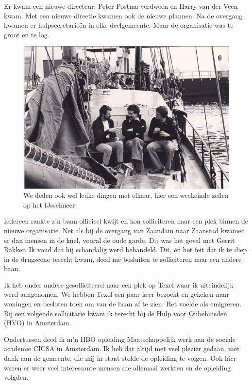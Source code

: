 \documentclass[10pt,twoside, openright]{memoir}
\begin{document}
Er kwam een nieuwe directeur. Peter Postma verdween en Harry van der Veen kwam. Met een nieuwe directie kwamen ook de nieuwe plannen. Na de overgang kwamen er hulpsecretarieën in elke deelgemeente. Maar de organisatie was te groot en te log. 

\begin{figure}
\includegraphics[width=\textwidth]{img/ch42/desoos_0004}
\caption*{\footnotesize We deden ook wel leuke dingen met elkaar, hier een weekeinde zeilen op het IJsselmeer.}
\end{figure}

Iedereen raakte z’n baan officieel kwijt en kon solliciteren naar een plek binnen de nieuwe organisatie. Net als bij de overgang van Zaandam naar Zaanstad kwamen er dan mensen in de knel, vooral de oude garde. Dit was het geval met Gerrit Bakker. Ik vond dat hij schandalig werd behandeld. Dit, én het feit dat ik te diep in de drugscene terecht kwam, deed me besluiten te solliciteren naar een andere baan. 

Ik heb onder andere gesolliciteerd naar een plek op Texel waar ik uiteindelijk werd aangenomen. We hebben Texel een paar keer bezocht en gekeken naar woningen en besloten toen om van de baan af te zien. Het voelde als emigreren. Bij een volgende sollicitatie kwam ik terecht bij de Hulp voor Onbehuisden (HVO) in Amsterdam.

Ondertussen deed ik m’n HBO opleiding Maatschappelijk werk aan de sociale academie CICSA in Amsterdam. Ik heb dat altijd met veel plezier gedaan, met dank aan de gemeente, die mij in staat stelde de opleiding te volgen. Ook hier waren er weer veel interessante mensen die allemaal werkten en de opleiding volgden. 
\end{document}
